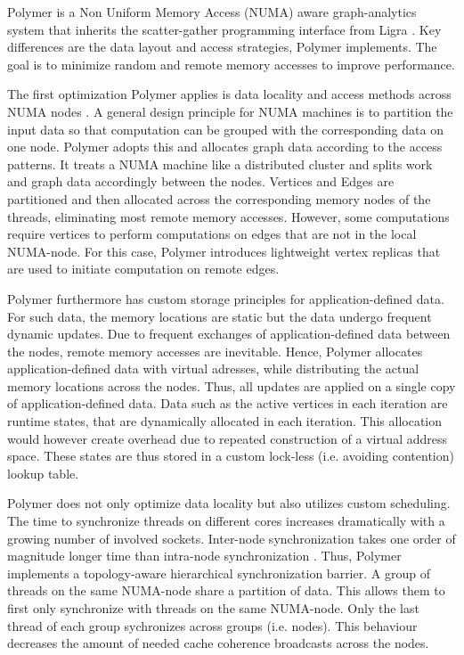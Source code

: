 
Polymer is a Non Uniform Memory Access (NUMA) aware graph-analytics system that inherits the scatter-gather programming interface from Ligra \cite{Ligra}.
Key differences are the data layout and access strategies, Polymer implements.
The goal is to minimize random and remote memory accesses to improve performance.

The first optimization Polymer applies is data locality and access methods across NUMA nodes \cite{Polymer}.
A general design principle for NUMA machines is to partition the input data so that computation can be grouped with the corresponding data on one node.
Polymer adopts this and allocates graph data according to the access patterns.
It treats a NUMA machine like a distributed cluster and splits work and graph data accordingly between the nodes.
Vertices and Edges are partitioned and then allocated across the corresponding memory nodes of the threads, eliminating most remote memory accesses.
However, some computations require vertices to perform computations on edges that are not in the local NUMA-node.
For this case, Polymer introduces lightweight vertex replicas that are used to initiate computation on remote edges.

Polymer furthermore has custom storage principles for application-defined data.
For such data, the memory locations are static but the data undergo frequent dynamic updates. Due to frequent exchanges of application-defined data between the nodes, remote memory accesses are inevitable.
Hence, Polymer allocates application-defined data with virtual adresses, while distributing the actual memory locations across the nodes. Thus, all updates are applied on a single copy of application-defined data.
Data such as the active vertices in each iteration are runtime states, that are dynamically allocated in each iteration. This allocation would however create overhead due to repeated construction of a virtual address space.
These states are thus stored in a custom lock-less (i.e. avoiding contention) lookup table.

Polymer does not only optimize data locality but also utilizes custom scheduling.
The time to synchronize threads on different cores increases dramatically with a growing number of involved sockets. Inter-node synchronization takes one order of magnitude longer time than intra-node synchronization \cite{Polymer}.
Thus, Polymer implements a topology-aware hierarchical synchronization barrier.
A group of threads on the same NUMA-node share a partition of data. This allows them to first only synchronize with threads on the same NUMA-node. Only the last thread of each group sychronizes across groups (i.e. nodes). This behaviour decreases the amount of needed cache coherence broadcasts across the nodes.

